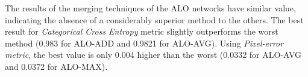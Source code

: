 % 

The results of the merging techniques of the ALO networks have similar value, indicating the absence of a considerably superior method to the others.
The best result for \textit{Categorical Cross Entropy} metric slightly outperforms the worst method (0.983 for ALO-ADD and 0.9821 for ALO-AVG).
Using \textit{Pixel-error metric}, the best value is only 0.004 higher than the worst (0.0332 for ALO-AVG and 0.0372 for ALO-MAX).

